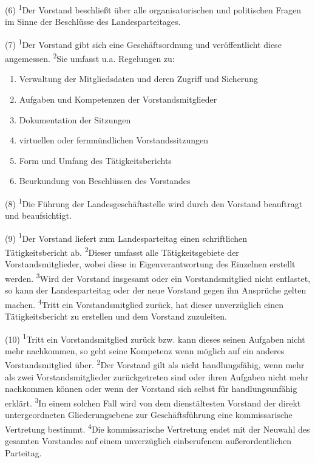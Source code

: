 (6) \textsuperscript{1}Der Vorstand beschließt über alle
organisatorischen und politischen Fragen im Sinne der Beschlüsse des
Landesparteitages.

(7) \textsuperscript{1}Der Vorstand gibt sich eine Geschäftsordnung und
veröffentlicht diese angemessen. \textsuperscript{2}Sie umfasst u.a.
Regelungen zu:

\begin{enumerate}
\item
  Verwaltung der Mitgliedsdaten und deren Zugriff und Sicherung
\item
  Aufgaben und Kompetenzen der Vorstandsmitglieder
\item
  Dokumentation der Sitzungen
\item
  virtuellen oder fernmündlichen Vorstandssitzungen
\item
  Form und Umfang des Tätigkeitsberichts
\item
  Beurkundung von Beschlüssen des Vorstandes
\end{enumerate}
(8) \textsuperscript{1}Die Führung der Landesgeschäftsstelle wird durch
den Vorstand beauftragt und beaufsichtigt.

(9) \textsuperscript{1}Der Vorstand liefert zum Landesparteitag einen
schriftlichen Tätigkeitsbericht ab. \textsuperscript{2}Dieser umfasst
alle Tätigkeitsgebiete der Vorstandsmitglieder, wobei diese in
Eigenverantwortung des Einzelnen erstellt werden.
\textsuperscript{3}Wird der Vorstand insgesamt oder ein
Vorstandsmitglied nicht entlastet, so kann der Landesparteitag oder der
neue Vorstand gegen ihn Ansprüche gelten machen.
\textsuperscript{4}Tritt ein Vorstandsmitglied zurück, hat dieser
unverzüglich einen Tätigkeitsbericht zu erstellen und dem Vorstand
zuzuleiten.

(10) \textsuperscript{1}Tritt ein Vorstandsmitglied zurück bzw. kann
dieses seinen Aufgaben nicht mehr nachkommen, so geht seine Kompetenz
wenn möglich auf ein anderes Vorstandsmitglied über.
\textsuperscript{2}Der Vorstand gilt als nicht handlungsfähig, wenn mehr
als zwei Vorstandsmitglieder zurückgetreten sind oder ihren Aufgaben
nicht mehr nachkommen können oder wenn der Vorstand sich selbst für
handlungsunfähig erklärt. \textsuperscript{3}In einem solchen Fall wird
von dem dienstältesten Vorstand der direkt untergeordneten
Gliederungsebene zur Geschäftsführung eine kommissarische Vertretung
bestimmt. \textsuperscript{4}Die kommissarische Vertretung endet mit der
Neuwahl des gesamten Vorstandes auf einem unverzüglich einberufenem
außerordentlichen Parteitag.

